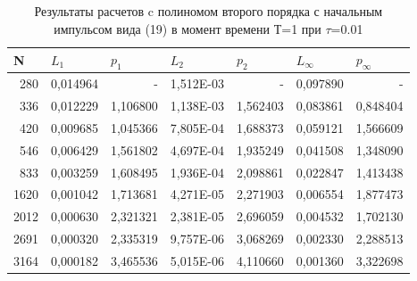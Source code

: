 \documentclass[14pt]{article}
\begin{document}
\begin{table}[H]
\caption{Результаты расчетов c полиномом второго порядка с начальным импульсом вида (19) в момент времени Т=1 при $\tau$=0.01}
\begin{tabular}{|r|r|r|r|r|r|r|}
\hline
\multicolumn{1}{|l|}{N} & \multicolumn{1}{l|}{$L_1$}        & \multicolumn{1}{l|}{$p_1$} & \multicolumn{1}{l|}{$L_2$}     & \multicolumn{1}{l|}{$p_2$} & \multicolumn{1}{l|}{$L_\infty$} & \multicolumn{1}{l|}{$p_\infty$} \\ \hline
280                         & 0,014964                      & -                         & 1,512E-03                      &-    & 0,097890                      & -                           \\ \hline
336                         & 0,012229                      & 1,106800                  & 1,138E-03                      & 1,562403                  & 0,083861                      & 0,848404                    \\ \hline
420                         & 0,009685                      & 1,045366                  & 7,805E-04                      & 1,688373                  & 0,059121                      & 1,566609                    \\ \hline
546                         & 0,006429                      & 1,561802                  & 4,697E-04                      & 1,935249                  & 0,041508                      & 1,348090                    \\ \hline
833                         & 0,003259                      & 1,608495                  & 1,936E-04                      & 2,098861                  & 0,022847                      & 1,413438                    \\ \hline
1620                        & 0,001042                      & 1,713681                  & 4,271E-05                      & 2,271903                  & 0,006554                      & 1,877473                    \\ \hline
2012                        & 0,000630                      & 2,321321                  & 2,381E-05                      & 2,696059                  & 0,004532                      & 1,702130                    \\ \hline
2691                        & 0,000320                      & 2,335319                  & 9,757E-06                      & 3,068269                  & 0,002330                      & 2,288513                    \\ \hline
3164                        & 0,000182                      & 3,465536                  & 5,015E-06                      & 4,110660                  & 0,001360                      & 3,322698                    \\ \hline

\end{tabular}
\end{table}
\end{document}

